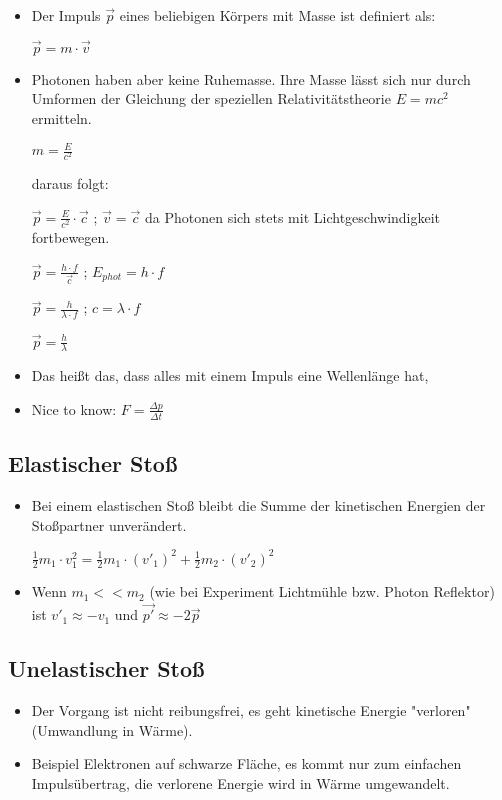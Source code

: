 \begin{itemize}
\item Der Impuls $\vec{p}$ eines beliebigen Körpers mit Masse ist definiert als: 

$\vec{p} = m \cdot \vec{v}$
\item Photonen haben aber keine Ruhemasse. Ihre Masse lässt sich nur durch Umformen der Gleichung der speziellen Relativitätstheorie $E = mc^2$ ermitteln.

$m = \frac{E}{c^2}$

daraus folgt:

$\vec{p} = \frac{E}{c^2} \cdot \vec{c}$  ; $\vec{v} = \vec{c}$ da Photonen sich stets mit Lichtgeschwindigkeit fortbewegen.

$\vec{p} = \frac{h \cdot f}{\vec{c}}$  ; $E_{phot} = h \cdot f$

$\vec{p} = \frac{h}{\lambda \cdot f}$  ; $c = \lambda \cdot f$

$\vec{p} = \frac{h}{\lambda}$
\item Das heißt das, dass alles mit einem Impuls eine Wellenlänge hat, 
\item Nice to know: $F = \frac{\Delta p}{\Delta t}$
\end{itemize}

\subsection{Elastischer Stoß}
\begin{itemize}
\item Bei einem elastischen Stoß bleibt die Summe der kinetischen Energien der Stoßpartner unverändert.

$\frac{1}{2}m_1 \cdot v_1^2 = \frac{1}{2}m_1 \cdot (v'_1)^2 + \frac{1}{2}m_2 \cdot (v'_2)^2$
\item Wenn $m_1 << m_2$ (wie bei Experiment Lichtmühle bzw. Photon Reflektor) ist $v'_1 \approx -v_1$ und $\vec{p'} \approx -2 \vec{p}$
\end{itemize}

\subsection{Unelastischer Stoß}
\begin{itemize}
\item Der Vorgang ist nicht reibungsfrei, es geht kinetische Energie "verloren" (Umwandlung in Wärme).
\item Beispiel Elektronen auf schwarze Fläche, es kommt nur zum einfachen Impulsübertrag, die verlorene Energie wird in Wärme umgewandelt.
\end{itemize}


